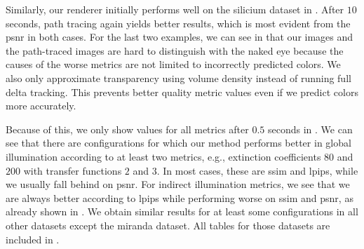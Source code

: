 Similarly, our renderer initially performs well on the \textsf{silicium} dataset
in . After $10$ seconds, path tracing again yields better 
results, which is most evident from the \ac{psnr} in both cases. For the last two
examples, we can see in  that our images and the
path-traced images are hard to distinguish with the naked eye because the causes
of the worse metrics are not limited to incorrectly predicted colors. We also
only approximate transparency using volume density instead of running full delta
tracking. This prevents better quality metric values even if we predict
colors more accurately.

Because of this, we only show values for all metrics after $0.5$ seconds in
. We can see that
there are configurations for which our method performs better in global
illumination according to at least two metrics, e.g., extinction coefficients
$80$ and $200$ with transfer functions $2$ and $3$. In most cases, these are
\ac{ssim} and \ac{lpips}, while we usually fall behind on \ac{psnr}. For
indirect illumination metrics, we see that we are always better according to
\ac{lpips} while performing worse on \ac{ssim} and \ac{psnr}, as already shown
in . We obtain similar results for at
least some configurations in all other datasets except the \textsf{miranda}
dataset. All tables for those datasets are included in .




